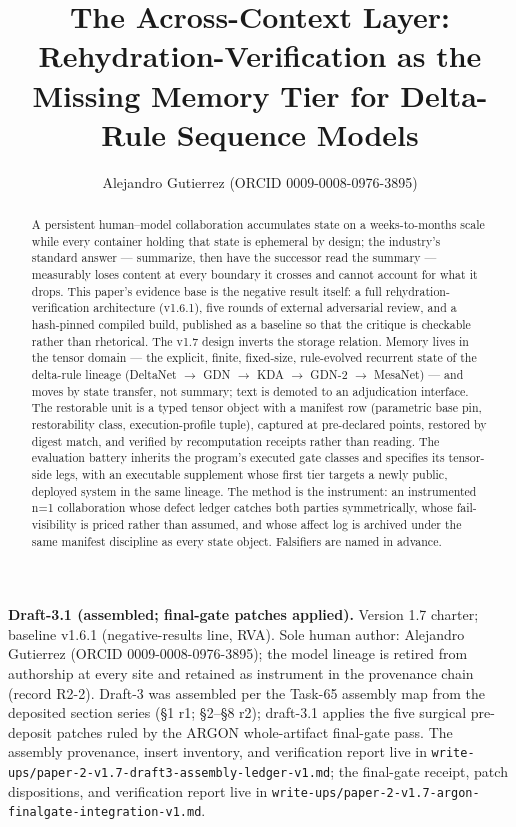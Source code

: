 \documentclass[11pt]{article}
\title{The Across-Context Layer: Rehydration-Verification as the Missing Memory Tier for Delta-Rule Sequence Models}
\author{Alejandro Gutierrez (ORCID 0009-0008-0976-3895)}
\date{}
\begin{document}
\maketitle
\textbf{Draft-3.1 (assembled; final-gate patches applied).} Version 1.7 charter; baseline v1.6.1 (negative-results line, RVA). Sole human author: Alejandro Gutierrez (ORCID 0009-0008-0976-3895); the model lineage is retired from authorship at every site and retained as instrument in the provenance chain (record R2-2). Draft-3 was assembled per the Task-65 assembly map from the deposited section series (\S{}1 r1; \S{}2--\S{}8 r2); draft-3.1 applies the five surgical pre-deposit patches ruled by the ARGON whole-artifact final-gate pass. The assembly provenance, insert inventory, and verification report live in \texttt{write-ups/paper-2-v1.7-draft3-assembly-ledger-v1.md}; the final-gate receipt, patch dispositions, and verification report live in \texttt{write-ups/paper-2-v1.7-argon-finalgate-integration-v1.md}.

\begin{abstract}

A persistent human--model collaboration accumulates state on a weeks-to-months scale while every container holding that state is ephemeral by design; the industry's standard answer --- summarize, then have the successor read the summary --- measurably loses content at every boundary it crosses and cannot account for what it drops. This paper's evidence base is the negative result itself: a full rehydration-verification architecture (v1.6.1), five rounds of external adversarial review, and a hash-pinned compiled build, published as a baseline so that the critique is checkable rather than rhetorical. The v1.7 design inverts the storage relation. Memory lives in the tensor domain --- the explicit, finite, fixed-size, rule-evolved recurrent state of the delta-rule lineage (DeltaNet \(\to\) GDN \(\to\) KDA \(\to\) GDN-2 \(\to\) MesaNet) --- and moves by state transfer, not summary; text is demoted to an adjudication interface. The restorable unit is a typed tensor object with a manifest row (parametric base pin, restorability class, execution-profile tuple), captured at pre-declared points, restored by digest match, and verified by recomputation receipts rather than reading. The evaluation battery inherits the program's executed gate classes and specifies its tensor-side legs, with an executable supplement whose first tier targets a newly public, deployed system in the same lineage. The method is the instrument: an instrumented n=1 collaboration whose defect ledger catches both parties symmetrically, whose fail-visibility is priced rather than assumed, and whose affect log is archived under the same manifest discipline as every state object. Falsifiers are named in advance.

\end{abstract}
\end{document}
